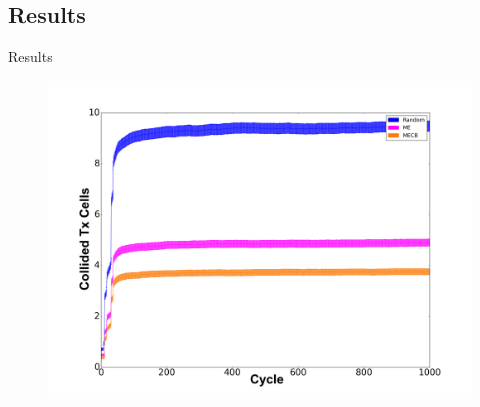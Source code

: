 \subsection{ Results}
\begin{withoutheadline}
\begin{frame}{Results}

\begin{figure}[p]

\includegraphics[width=\linewidth]{figures/Graph2.png}
\end{figure}



\end{frame}
\end{withoutheadline}




